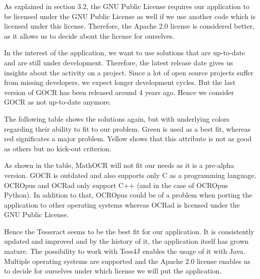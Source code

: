 As explained in section 3.2, the GNU Public License requires our application to be licensed under the GNU Public License as well if we use another code which is licensed under this license. Therefore, the Apache 2.0 license is considered better, as it allows us to decide about the license for ourselves.

In the interest of the application, we want to use solutions that are up-to-date and are still under development. Therefore, the latest release date gives us insights about the activity on a project. Since a lot of open source projects suffer from missing developers, we expect longer development cycles. But the last version of GOCR has been released around 4 years ago. Hence we consider GOCR as not up-to-date anymore.

The following table shows the solutions again, but with underlying colors regarding their ability to fit to our problem. Green is used as a best fit, whereas red significates a major problem. Yellow shows that this attribute is not as good as others but no kick-out criterion. 


As shown in the table, MathOCR will not fit our needs as it is a pre-alpha version. GOCR is outdated and also supports only C as a programming language. OCROpus and OCRad only support C++ (and in the case of OCROpus Python). In addition to that, OCROpus could be of a problem when porting the application to other operating systems whereas OCRad is licensed under the GNU Public License. 

Hence the Tesseract seems to be the best fit for our application. It is consistently updated and improved and by the history of it, the application itself has grown mature. The possibility to work with Tess4J enables the usage of it with Java. Multiple operating systems are supported and the Apache 2.0 license enables us to decide for ourselves under which license we will put the application.

